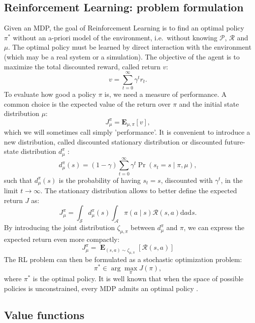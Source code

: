 \subsection{Reinforcement Learning: problem formulation}
Given an \ac{MDP}, the goal of Reinforcement Learning is to find an optimal policy $\pi^*$ without an a-priori model of the environment, i.e.\ without knowing $\mathcal{P}$, $\mathcal{R}$ and $\mu$. The optimal policy must be learned by direct interaction with the environment (which may be a real system or a simulation). The objective of the agent is to maximize the total discounted reward, called return $v$:
\[
	v = \sum_{t=0}^{\infty}\gamma^tr_{t}.
\]
To evaluate how good a policy $\pi$ is, we need a measure of performance. A common choice is the expected value of the return over $\pi$ and the initial state distribution $\mu$:
\[
	J_\mu^\pi = \mathbf{E}_{\mu,\pi}[v],
\]
which we will sometimes call simply 'performance'.
It is convenient to introduce a new distribution, called discounted stationary distribution or discounted future-state distribution $d_{\mu}^{\pi}$ \cite{Sutton1999a}:
\[
	d_{\mu}^{\pi}(s) = (1-\gamma)\sum_{t=0}^{\infty}\gamma^t\Pr(s_t=s\mid\pi,\mu),
\] 
such that $d_{\mu}^{\pi}(s)$ is the probability of having $s_t = s$, discounted with $\gamma^t$, in the limit $t\to\infty$.  
The stationary distribution allows to better define the expected return $J$ as:
\[
	J_\mu^\pi = \int_{\mathcal{S}}d_{\mu}^{\pi}(s)\int_{\mathcal{A}}\pi(a \mid s)\mathcal{R}(s,a)\mathrm{d}a\mathrm{d}s.
\]
By introducing the joint distribution $\zeta_{\mu,\pi}$ between $d_{\mu}^{\pi}$ and $\pi$, we can express the expected return even more compactly:
\[
	J_\mu^\pi = \mathop{\mathbf{E}}_{(s,a)\sim\zeta_{\mu,\pi}}\left[\mathcal{R}(s,a)\right]
\]
The \ac{RL} problem can then be formulated as a stochastic optimization problem:
\[
	\pi^* \in \arg\max\limits_{\pi}J(\pi),
\]
where $\pi^*$ is the optimal policy. It is well known that when the space of possible policies is unconstrained, every \ac{MDP} admits an optimal policy \cite{Weiss667}.

\subsection{Value functions}
